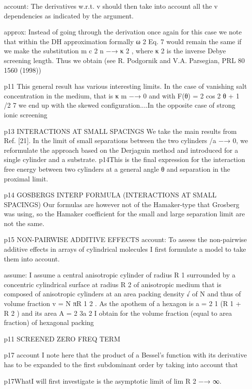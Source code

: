 account: The derivatives w.r.t. v should then take into account all the v dependencies as indicated by the argument.

approx: Instead of going through the derivation once again for this case we note that within the DH approximation formally
ω 2
Eq. 7 would remain the same if we make the substitution m c 2 n −→ κ 2 , where κ 2 is the inverse Debye screening
length. Thus we obtain (see R. Podgornik and V.A. Parsegian, PRL 80 1560 (1998))

p11 This general result has various interesting limits. In the case of vanishing salt concentration in the medium, that
is κ m −→ 0 and with F(θ) = 2 cos 2 θ + 1 /2 7 we end up with the skewed
configuration....In the opposite case of strong ionic screening

p13 INTERACTIONS AT SMALL SPACINGS
We take the main results from Ref. [21]. In the limit of small separations between the two cylinders /a −→ 0, we
reformulate the approach based on the Derjaguin method and introduced for a
single cylinder and a substrate.
p14This is the final expression for the interaction free energy between two cylinders at a general angle θ and separation
in the proximal limit.

p14 GOSBERGS INTERP FORMULA (INTERACTIONS AT SMALL SPACINGS)
Our formulas are however not of the Hamaker-type that Grosberg was using, so the Hamaker coefficient for the small
and large separation limit are not the same.

p15 NON-PAIRWISE ADDITIVE EFFECTS
account: To assess the non-pairwise additive effects in arrays of cylindrical molecules I first formulate a model to take them
into account. 

assume: I assume a central anisotropic cylinder of radius R 1 surrounded by a concentric cylindrical surface at
radius R 2 of anisotropic medium that is composed of anisotropic cylinders at an area packing density
√ of N and thus
of volume fraction v = N πR 1 2 . As the apothem of a hexagon is a = 2 1 (R 1 + R 2 ) and its area A = 2 3a 2 I obtain for
the volume fraction (equal to area fraction) of hexagonal packing


p11 SCREENED ZERO FREQ TERM

p17 account 
I note here that the product of a Bessel’s function with its derivative has to be expanded to the first subdominant
order by taking into account that

p17WhatI will first investigate is the asymptotic limit of lim R 2 −→ ∞.
